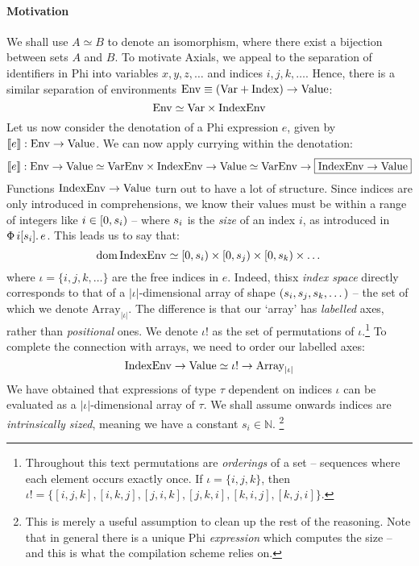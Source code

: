 \paragraph{Motivation}
We shall use $A \simeq B$ to denote an isomorphism, where there exist a bijection between sets $A$ and $B$. To motivate Axials, we appeal to the separation of identifiers in Phi into variables $x, y, z, \dots$ and indices $i, j, k, \dots$. Hence, there is a similar separation of environments $\mathrm{Env} \equiv (\mathrm{Var} + \mathrm{Index}) \to \mathrm{Value}$:
$$ \mathrm{Env} \simeq \mathrm{Var} \times \mathrm{IndexEnv} $$
Let us now consider the denotation of a Phi expression $e$, given by $\llbracket e \rrbracket : \mathrm{Env} \to \mathrm{Value}$. We can now apply currying within the denotation:
$$\llbracket e \rrbracket : \mathrm{Env} \to \mathrm{Value} \simeq \mathrm{VarEnv} \times \mathrm{IndexEnv} \to \mathrm{Value} \simeq \mathrm{VarEnv} \to \boxed{\mathrm{IndexEnv} \to \mathrm{Value}}$$
Functions $\mathrm{IndexEnv} \to \mathrm{Value}$ turn out to have a lot of structure.
Since indices are only introduced in  comprehensions, we know their values must be within a range of integers like $i \in \left[ 0, \sizeat i \right)$
-- where $s_{i}$ is the \textit{size} of an index $i$, as introduced in $\Phi\, {i}[{s_{i}}] \ldotp {e}$. 
This leads us to say that:
$$ \mathrm{dom}\,\denotenvindex \simeq \left[0, \sizeat i \right) \times \left[0, \sizeat j \right) \times \left[0, \sizeat k \right) \times \dots $$ 
where $\iota = \{i, j, k, \dots \}$ are the free indices in $e$.%
\newcommand{\denotarrayiota}{\mathrm{Array}_{|\iota|}}
Indeed, thisx \textit{index space} directly corresponds to that of a $|\iota|$-dimensional array of shape $(s_{i}, s_{j}, s_{k}, \dots)$ -- the set of which we denote $\denotarrayiota$. 
The difference is that our `array' has \textit{labelled} axes, rather than \textit{positional} ones.
We denote $\iota!$ as the set of permutations of $\iota$.\footnote{Throughout this text permutations are \textit{orderings} of a set -- sequences where each element occurs exactly once. If $\iota = \{i, j, k\}$, then $\iota! = \{[i, j, k], [i, k, j], [j, i, k], [j, k, i], [k, i, j], [k, j, i]\}$.}
To complete the connection with arrays, we need to order our labelled axes:
$$ \denotenvindex \to \denotvalue \simeq \iota! \to \denotarrayiota $$
We have obtained that expressions of type $\tau$ dependent on indices $\iota$ can be evaluated as a $|\iota|$-dimensional array of $\tau$. We shall assume onwards indices are \textit{intrinsically sized}, meaning we have a constant $s_i \in \mathbb N$.%
\footnote{This is merely a useful assumption to clean up the rest of the reasoning. Note that in general there is a unique Phi \textit{expression} which computes the size -- and this is what the compilation scheme relies on.}

